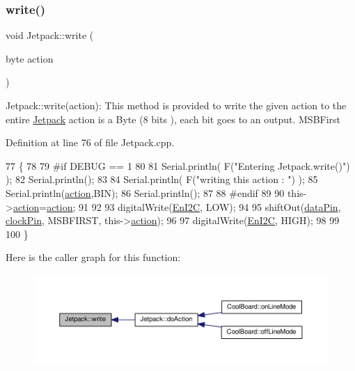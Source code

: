 \subsubsection{\texorpdfstring{write()}{write()}}
{\footnotesize\ttfamily void Jetpack\+::write (\begin{DoxyParamCaption}\item[{byte}]{action }\end{DoxyParamCaption})}

Jetpack\+::write(action)\+: This method is provided to write the given action to the entire \hyperlink{class_jetpack}{Jetpack} action is a Byte (8 bits ), each bit goes to an output. M\+S\+B\+First 

Definition at line 76 of file Jetpack.\+cpp.


\begin{DoxyCode}
77 \{
78 
79 \textcolor{preprocessor}{#if DEBUG == 1}
80 
81     Serial.println( F(\textcolor{stringliteral}{"Entering Jetpack.write()"}) );
82     Serial.println();
83 
84     Serial.println( F(\textcolor{stringliteral}{"writing this action : "}) );
85     Serial.println(\hyperlink{class_jetpack_aca3142925a7b0834b34ae91d26af7765}{action},BIN);
86     Serial.println();
87 
88 \textcolor{preprocessor}{#endif }
89 
90     this->\hyperlink{class_jetpack_aca3142925a7b0834b34ae91d26af7765}{action}=\hyperlink{class_jetpack_aca3142925a7b0834b34ae91d26af7765}{action};
91 
92     
93     digitalWrite(\hyperlink{class_jetpack_a81df984fb4cea98c71aa1a1cfcdfe814}{EnI2C}, LOW);
94     
95     shiftOut(\hyperlink{class_jetpack_a3d669a56e93c71dd25f970d4ed7d0c00}{dataPin}, \hyperlink{class_jetpack_a58ebb991f358f3ae94e82148b0221b5a}{clockPin}, MSBFIRST, this->\hyperlink{class_jetpack_aca3142925a7b0834b34ae91d26af7765}{action});
96 
97     digitalWrite(\hyperlink{class_jetpack_a81df984fb4cea98c71aa1a1cfcdfe814}{EnI2C}, HIGH);
98 
99 
100 \}
\end{DoxyCode}
Here is the caller graph for this function\+:\nopagebreak
\begin{figure}[H]
\begin{center}
\leavevmode
\includegraphics[width=350pt]{df/d1d/class_jetpack_a338f1af8cbc6504ac69b47c7328569b5_icgraph}
\end{center}
\end{figure}
\mbox{\label{class_jetpack_a79ae7bc3c1828a0551a7c005c4f8bd00}} 
